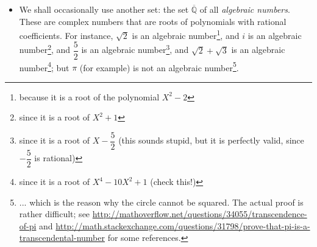 \documentclass[numbers=enddot,12pt,final,onecolumn,notitlepage]{scrartcl}%
\theoremstyle{definition}
\begin{document}
\begin{itemize}
Complex numbers can be formally defined as pairs of real numbers $\left(
a,b\right)  $ with an entrywise addition (that is, $\left(  a,b\right)
+\left(  a^{\prime},b^{\prime}\right)  =\left(  a+a^{\prime},b+b^{\prime
}\right)  $, exactly like $1\times2$-matrices) and a somewhat strange-looking
multiplication (namely, $\left(  a,b\right)  \left(  a^{\prime},b^{\prime
}\right)  =\left(  aa^{\prime}-bb^{\prime},ab^{\prime}+ba^{\prime}\right)
$).\ \ \ \ \footnote{This sort of definition is not unlike our definition of
matrices: they are also tables with entrywise addition and a less simple
multiplication.} But the way everyone thinks about complex numbers
(informally) is that they are an extension of real numbers (so $\mathbb{R}$ is
a subset of $\mathbb{C}$) by adding a new \textquotedblleft imaginary
number\textquotedblright\ $i$ which satisfies $i^{2}=-1$. They are supposed to
behave like real numbers as far as laws of addition and multiplication are
concerned (thus, for instance, $a\left(  b+c\right)  =ab+ac$ and $a\left(
bc\right)  =\left(  ab\right)  c$); using these laws and the requirement that
$i^{2}=-1$, one can easily see how to multiply and add arbitrary complex
numbers. These two definitions (the formal one as pairs of real numbers, and
the informal one as \textquotedblleft extended real numbers\textquotedblright)
are equivalent, and the complex number $\left(  a,b\right)  $ (according to
the first definition) corresponds to the complex number $a+bi$ (according to
the second definition).

For a detailed introduction to complex numbers, see \cite[\S 2]{LaNaSc16}.

\item We shall occasionally use another set: the set $\overline{\mathbb{Q}}$
of all \textit{algebraic numbers}. These are complex numbers that are roots of
polynomials with rational coefficients. For instance, $\sqrt{2}$ is an
algebraic number\footnote{because it is a root of the polynomial $X^{2}-2$},
and $i$ is an algebraic number\footnote{since it is a root of $X^{2}+1$}, and
$\dfrac{5}{2}$ is an algebraic number\footnote{since it is a root of
$X-\dfrac{5}{2}$ (this sounds stupid, but it is perfectly valid, since
$-\dfrac{5}{2}$ is rational)}, and $\sqrt{2}+\sqrt{3}$ is an algebraic
number\footnote{since it is a root of $X^{4}-10X^{2}+1$ (check this!)}; but
$\pi$ (for example) is not an algebraic number\footnote{... which is the
reason why the circle cannot be squared. The actual proof is rather difficult;
see \url{http://mathoverflow.net/questions/34055/transcendence-of-pi} and
\url{http://math.stackexchange.com/questions/31798/prove-that-pi-is-a-transcendental-number}
for some references.}.


\end{itemize}
\end{document}
